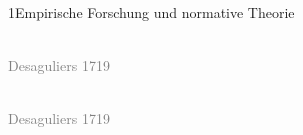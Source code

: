 \documentclass[xcolor=table,9pt,aspectratio=169]{beamer}
\begin{document}
\begin{frame}{\vspace*{10mm}1\hspace*{1em}Empirische Forschung und normative Theorie}
\begin{multicols}{2}
   \begin{center}
      \\
      \textcolor{gray}{Desaguliers 1719}
   \end{center}
   \vfill
   \begin{center}
      \\
      \textcolor{gray}{Desaguliers 1719}
   \end{center}
\end{multicols}
\end{frame}
\end{document}
